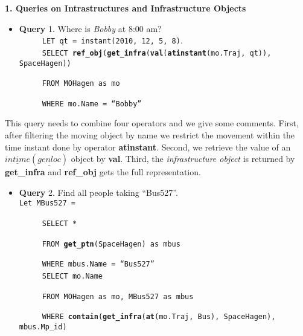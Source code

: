 \textbf{1. Queries on Intrastructures and Infrastructure Objects} 

\begin{itemize}
 \item \textbf{Query} 1. Where is \textit{Bobby} at 8:00 am? \\

$\hspace{1cm}$ \texttt{LET qt = instant(2010, 12, 5, 8)}. \\


$\hspace{1cm}$ \texttt{SELECT \textbf{ref\_obj}(\textbf{get\_infra}(\textbf{val}(\textbf{atinstant}(mo.Traj, qt)), SpaceHagen))}

$\hspace{1cm}$ \texttt{FROM MOHagen as mo}

$\hspace{1cm}$ \texttt{WHERE mo.Name = ``Bobby''}
\end{itemize}

This query needs to combine four operators and we give some comments. First, after filtering the moving object by name we restrict the movement within the time instant done by operator \textbf{atinstant}. Second, we retrieve the value of an $\underline{intime}(\underline{genloc})$ object by \textbf{val}. Third, the \textit{infrastructure object} is returned by \textbf{get\_infra} and \textbf{ref\_obj} gets the full representation.  \\ 

\begin{itemize}
 \item \textbf{Query} 2. Find all people taking ``Bus527''. \\

\texttt{Let MBus527 =}

$\hspace{1cm}$ \texttt{SELECT *}

$\hspace{1cm}$ \texttt{FROM \textbf{get\_ptn}(SpaceHagen) as mbus}

$\hspace{1cm}$ \texttt{WHERE mbus.Name = ``Bus527''} \\


$\hspace{1cm}$ \texttt{SELECT mo.Name}

$\hspace{1cm}$ \texttt{FROM MOHagen as mo, MBus527 as mbus}

$\hspace{1cm}$ \texttt{WHERE \textbf{contain}(\textbf{get\_infra}(\textbf{at}(mo.Traj, Bus), SpaceHagen), mbus.Mp\_id)}


\end{itemize}

